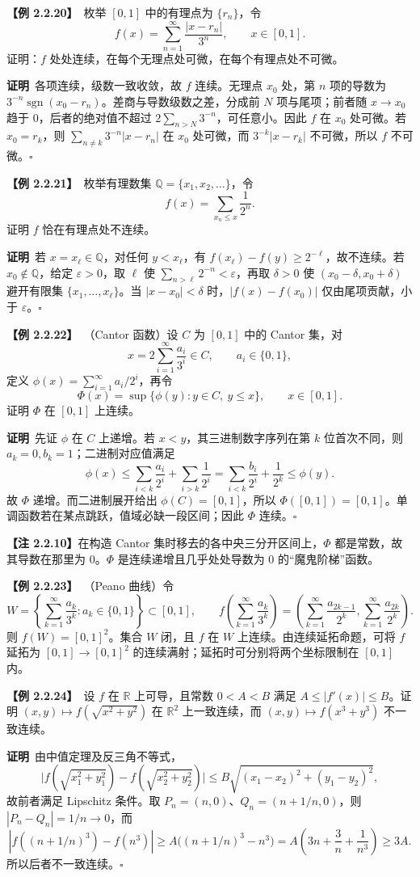 \documentclass[UTF8,a4paper,11pt]{ctexart}
\newcommand{\ex}[1]{\par\medskip\noindent\textbf{【例 #1】}\ }
\newcommand{\pf}{\par\noindent\textbf{证明}\ }
\begin{document}
\ex{2.2.20}枚举 $[0,1]$ 中的有理点为 $\{r_n\}$，令
\[
f(x)=\sum_{n=1}^{\infty}\frac{|x-r_n|}{3^n},\qquad x\in[0,1].
\]
证明：$f$ 处处连续，在每个无理点处可微，在每个有理点处不可微。
\pf 各项连续，级数一致收敛，故 $f$ 连续。无理点 $x_0$ 处，第 $n$ 项的导数为 $3^{-n}\operatorname{sgn}(x_0-r_n)$。差商与导数级数之差，分成前 $N$ 项与尾项；前者随 $x\to x_0$ 趋于 $0$，后者的绝对值不超过 $2\sum_{n>N}3^{-n}$，可任意小。因此 $f$ 在 $x_0$ 处可微。若 $x_0=r_k$，则 $\sum_{n\ne k}3^{-n}|x-r_n|$ 在 $x_0$ 处可微，而 $3^{-k}|x-r_k|$ 不可微，所以 $f$ 不可微。\hfill$\square$

\ex{2.2.21}枚举有理数集 $\mathbb Q=\{x_1,x_2,\ldots\}$，令
\[
f(x)=\sum_{x_n\le x}\frac1{2^n}.
\]
证明 $f$ 恰在有理点处不连续。
\pf 若 $x=x_\ell\in\mathbb Q$，对任何 $y<x_\ell$，有 $f(x_\ell)-f(y)\ge2^{-\ell}$，故不连续。若 $x_0\notin\mathbb Q$，给定 $\varepsilon>0$，取 $\ell$ 使 $\sum_{n>\ell}2^{-n}<\varepsilon$，再取 $\delta>0$ 使 $(x_0-\delta,x_0+\delta)$ 避开有限集 $\{x_1,\ldots,x_\ell\}$。当 $|x-x_0|<\delta$ 时，$|f(x)-f(x_0)|$ 仅由尾项贡献，小于 $\varepsilon$。\hfill$\square$

\ex{2.2.22}（Cantor 函数）设 $C$ 为 $[0,1]$ 中的 Cantor 集，对
\[
x=2\sum_{i=1}^{\infty}\frac{a_i}{3^i}\in C,\qquad a_i\in\{0,1\},
\]
定义 $\phi(x)=\sum_{i=1}^{\infty}a_i/2^i$，再令
\[
\Phi(x)=\sup\{\phi(y):y\in C,\ y\le x\},\qquad x\in[0,1].
\]
证明 $\Phi$ 在 $[0,1]$ 上连续。
\pf 先证 $\phi$ 在 $C$ 上递增。若 $x<y$，其三进制数字序列在第 $k$ 位首次不同，则 $a_k=0,b_k=1$；二进制对应值满足
\[
\phi(x)\le\sum_{i<k}\frac{a_i}{2^i}+\sum_{i>k}\frac1{2^i}
=\sum_{i<k}\frac{b_i}{2^i}+\frac1{2^k}\le\phi(y).
\]
故 $\Phi$ 递增。而二进制展开给出 $\phi(C)=[0,1]$，所以 $\Phi([0,1])=[0,1]$。单调函数若在某点跳跃，值域必缺一段区间；因此 $\Phi$ 连续。\hfill$\square$

\noindent\textbf{【注 2.2.10】}在构造 Cantor 集时移去的各中央三分开区间上，$\Phi$ 都是常数，故其导数在那里为 $0$。$\Phi$ 是连续递增且几乎处处导数为 $0$ 的“魔鬼阶梯”函数。

\ex{2.2.23}（Peano 曲线）令
\[
W=\left\{\sum_{k=1}^{\infty}\frac{a_k}{3^k}:a_k\in\{0,1\}\right\}\subset[0,1],
\qquad
f\left(\sum_{k=1}^{\infty}\frac{a_k}{3^k}\right)
=\left(\sum_{k=1}^{\infty}\frac{a_{2k-1}}{2^k},
\sum_{k=1}^{\infty}\frac{a_{2k}}{2^k}\right).
\]
则 $f(W)=[0,1]^2$。集合 $W$ 闭，且 $f$ 在 $W$ 上连续。由连续延拓命题，可将 $f$ 延拓为 $[0,1]\to[0,1]^2$ 的连续满射；延拓时可分别将两个坐标限制在 $[0,1]$ 内。

\ex{2.2.24}设 $f$ 在 $\mathbb R$ 上可导，且常数 $0<A<B$ 满足 $A\le|f'(x)|\le B$。证明 $(x,y)\mapsto f(\sqrt{x^2+y^2})$ 在 $\mathbb R^2$ 上一致连续，而 $(x,y)\mapsto f(x^3+y^3)$ 不一致连续。
\pf 由中值定理及反三角不等式，
\[
\bigl|f(\sqrt{x_1^2+y_1^2})-f(\sqrt{x_2^2+y_2^2})\bigr|
\le B\sqrt{(x_1-x_2)^2+(y_1-y_2)^2},
\]
故前者满足 Lipschitz 条件。取 $P_n=(n,0)$、$Q_n=(n+1/n,0)$，则 $|P_n-Q_n|=1/n\to0$，而
\[
|f((n+1/n)^3)-f(n^3)|
\ge A\bigl((n+1/n)^3-n^3\bigr)
=A\left(3n+\frac3n+\frac1{n^3}\right)\ge3A.
\]
所以后者不一致连续。\hfill$\square$
\end{document}
